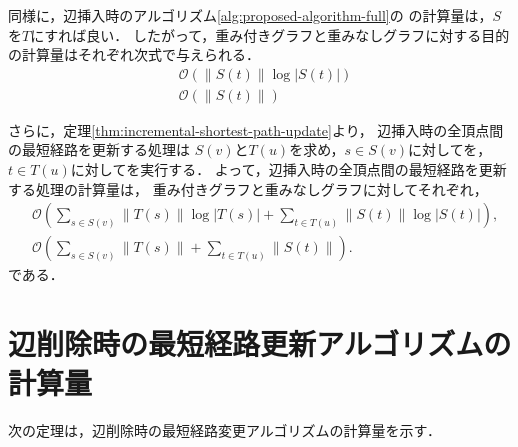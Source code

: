 同様に，辺挿入時のアルゴリズム\ref{alg:proposed-algorithm-full}の
の計算量は，$S$を$T$にすれば良い．
したがって，重み付きグラフと重みなしグラフに対する目的の計算量はそれぞれ次式で与えられる．
\begin{equation*}
  \begin{aligned}
    &\mathcal{O}\left(\|S(t)\|\log|S(t)|\right) \\
    &\mathcal{O}\left(\|S(t)\|\right)
  \end{aligned}
\end{equation*}

さらに，定理\ref{thm:incremental-shortest-path-update}より，
辺挿入時の全頂点間の最短経路を更新する処理は
$S(v)$と$T(u)$を求め，$s\in S(v)$に対してを，
$t\in T(u)$に対してを実行する．
よって，辺挿入時の全頂点間の最短経路を更新する処理の計算量は，
重み付きグラフと重みなしグラフに対してそれぞれ，
\begin{align}
  &\mathcal{O}\left(\sum_{s\in S(v)}\|T(s)\|\log|T(s)|+\sum_{t\in T(u)}\|S(t)\|\log|S(t)|\right),
  \label{eq:full-incremental-shortest-path-update-weighted} \\
  &\mathcal{O}\left(\sum_{s\in S(v)}\|T(s)\|+\sum_{t\in T(u)}\|S(t)\|\right).
  \label{eq:full-incremental-shortest-path-update-unweighted}
  \end{align}
である．

\section{辺削除時の最短経路更新アルゴリズムの計算量}
次の定理は，辺削除時の最短経路変更アルゴリズムの計算量を示す．

